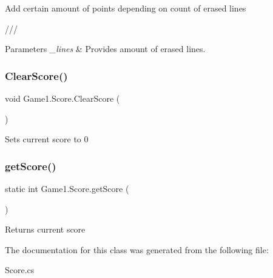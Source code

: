 Add certain amount of points depending on count of erased lines 

/// 
\begin{DoxyParams}{Parameters}
{\em \+\_\+lines} & Provides amount of erased lines.\\
\hline
\end{DoxyParams}
\mbox{\label{class_game1_1_1_score_a4d4e002635cc2683c7ce000ce47f68e4}} 
\subsubsection{\texorpdfstring{ClearScore()}{ClearScore()}}
{\footnotesize\ttfamily void Game1.\+Score.\+Clear\+Score (\begin{DoxyParamCaption}{ }\end{DoxyParamCaption})}



Sets current score to 0 

\mbox{\label{class_game1_1_1_score_a7797ed7e99fe9bbc22cebcd6b67d7db6}} 
\subsubsection{\texorpdfstring{getScore()}{getScore()}}
{\footnotesize\ttfamily static int Game1.\+Score.\+get\+Score (\begin{DoxyParamCaption}{ }\end{DoxyParamCaption})\hspace{0.3cm}{\ttfamily [static]}}



Returns current score 



The documentation for this class was generated from the following file\+:\begin{DoxyCompactItemize}
\item 
Score.\+cs\end{DoxyCompactItemize}
